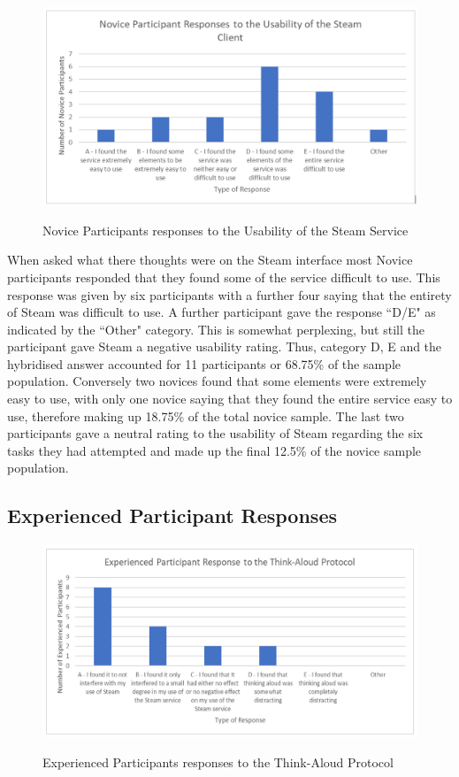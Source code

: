 \begin{figure}[H]
\includegraphics[width=\linewidth]{Screenshots/DemographicsQuestionaires/noviceQuestionaireData/noviceSteamClient.png}
\label{NoviceSteamUsability}
\caption{Novice Participants responses to the Usability of the Steam Service}
\end{figure}

When asked what there thoughts were on the Steam interface most Novice participants responded that they found some of the service difficult to use. This response was given by six participants with a further four saying that the entirety of Steam was difficult to use. A further participant gave the response ``D/E" as indicated by the ``Other" category. This is somewhat perplexing, but still the participant gave Steam a negative usability rating. Thus, category D, E and the hybridised answer accounted for 11 participants or 68.75\% of the sample population. Conversely two novices found that some elements were extremely easy to use, with only one novice saying that they found the entire service easy to use, therefore making up 18.75\% of the total novice sample. The last two participants gave a neutral rating to the usability of Steam regarding the six tasks they had attempted and made up the final 12.5\% of the novice sample population.

\subsection{Experienced Participant Responses}
\begin{figure}[H]
\includegraphics[width=\linewidth]{Screenshots/DemographicsQuestionaires/experiencedQuestionaireData/experiencedTAP.png}
\label{ExperiencedTAP}
\caption{Experienced Participants responses to the Think-Aloud Protocol}
\end{figure}

